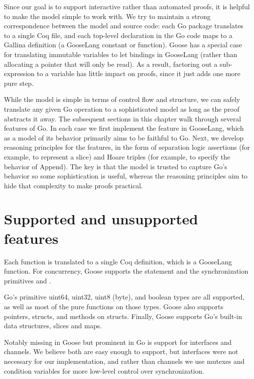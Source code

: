 Since our goal is to support interactive rather than automated proofs,
it is helpful to make the model simple to work with. We try to maintain
a strong correspondence between the model and source code: each Go
package translates to a single Coq file, and each top-level declaration
in the Go code maps to a Gallina definition (a GooseLang constant or
function). Goose has a special case for translating immutable variables
to let bindings in GooseLang (rather than allocating a pointer that will
only be read). As a result, factoring out a sub-expression to a variable
has little impact on proofs, since it just adds one more pure step.

While the model is simple in terms of control flow and structure, we can
safely translate any given Go operation to a sophisticated model as long
as the proof abstracts it away. The subsequent sections in this chapter
walk through several features of Go. In each case we first implement the
feature in GooseLang, which as a model of its behavior primarily aims to
be faithful to Go. Next, we develop reasoning principles for the
features, in the form of separation logic assertions (for example, to
represent a slice) and Hoare triples (for example, to specify the
behavior of Append). The key is that the model is trusted to capture
Go's behavior so some sophistication is useful, whereas the reasoning
principles aim to hide that complexity to make proofs practical.

\section{Supported and unsupported
features}

Each function is translated to a single Coq definition, which is a
GooseLang function. For concurrency, Goose supports the 
statement and the synchronization primitives  and
.

Go's primitive uint64, uint32, uint8 (byte), and boolean types are all
supported, as well as most of the pure functions on those types. Goose
also supports pointers, structs, and methods on structs. Finally, Goose
supports Go's built-in data structures, slices and maps.

Notably missing in Goose but prominent in Go is support for interfaces
and channels. We believe both are easy enough to support, but interfaces
were not necessary for our implementation, and rather than channels we
use mutexes and condition variables for more low-level control over
synchronization.

